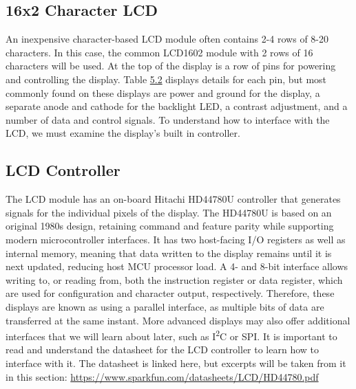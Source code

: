 \documentclass[
  9pt,
  letterpaper,
  abstract,
  titlepage]{scrbook}
\begin{document}
\subsection{16x2 Character LCD}\label{x2-character-lcd}

An inexpensive character-based LCD module often contains 2-4 rows of
8-20 characters. In this case, the common LCD1602 module with 2 rows of
16 characters will be used. At the top of the display is a row of pins
for powering and controlling the display. Table
\hyperref[table:16x2lcdpins]{5.2} displays details for each pin, but
most commonly found on these displays are power and ground for the
display, a separate anode and cathode for the backlight LED, a contrast
adjustment, and a number of data and control signals. To understand how
to interface with the LCD, we must examine the display's built in
controller.

\subsection{LCD Controller}\label{lcd-controller}

The LCD module has an on-board Hitachi HD44780U controller that
generates signals for the individual pixels of the display. The HD44780U
is based on an original 1980s design, retaining command and feature
parity while supporting modern microcontroller interfaces. It has two
host-facing I/O registers as well as internal memory, meaning that data
written to the display remains until it is next updated, reducing host
MCU processor load. A 4- and 8-bit interface allows writing to, or
reading from, both the instruction register or data register, which are
used for configuration and character output, respectively. Therefore,
these displays are known as using a parallel interface, as multiple bits
of data are transferred at the same instant. More advanced displays may
also offer additional interfaces that we will learn about later, such as
I\textsuperscript{2}C or SPI. It is important to read and understand the
datasheet for the LCD controller to learn how to interface with it. The
datasheet is linked here, but excerpts will be taken from it in this
section: \url{https://www.sparkfun.com/datasheets/LCD/HD44780.pdf}
\end{document}
